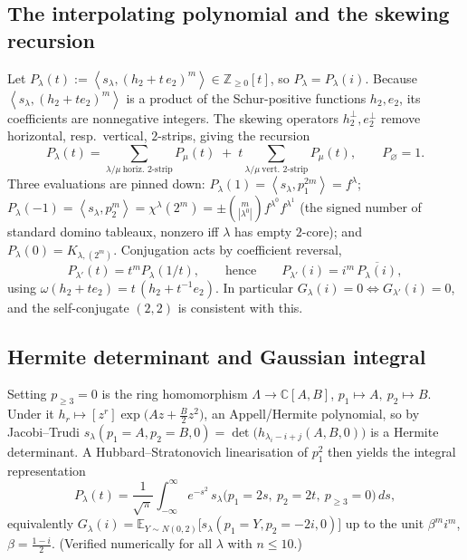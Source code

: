 \documentclass[11pt]{article}
\theoremstyle{definition}
\theoremstyle{remark}
\newcommand{\ZZ}{\mathbb{Z}}
\newcommand{\CC}{\mathbb{C}}
\newcommand{\la}{\lambda}
\newcommand{\inner}[1]{\left\langle #1 \right\rangle}
\begin{document}
\subsection{The interpolating polynomial and the skewing recursion}
Let $P_\la(t):=\inner{s_\la,(h_2+t\,e_2)^m}\in\ZZ_{\ge0}[t]$, so $P_\la=P_\la(i)$.
Because $\inner{s_\la,(h_2+te_2)^m}$ is a product of the Schur-positive functions
$h_2,e_2$, its coefficients are nonnegative integers. The skewing operators
$h_2^{\perp},e_2^{\perp}$ remove horizontal, resp.\ vertical, $2$-strips, giving
the recursion
\begin{equation}\label{eq:rec}
  P_\la(t)=\sum_{\la/\mu\ \text{horiz.\ }2\text{-strip}}P_\mu(t)
          \;+\;t\!\!\sum_{\la/\mu\ \text{vert.\ }2\text{-strip}}\!\!P_\mu(t),
  \qquad P_\varnothing=1.
\end{equation}
Three evaluations are pinned down: $P_\la(1)=\inner{s_\la,p_1^{2m}}=f^\la$;
$P_\la(-1)=\inner{s_\la,p_2^{m}}=\chi^\la(2^m)=\pm\binom{m}{|\la^0|}f^{\la^0}f^{\la^1}$
(the signed number of standard domino tableaux, nonzero iff $\la$ has empty
$2$-core); and $P_\la(0)=K_{\la,(2^m)}$. Conjugation acts by coefficient
reversal,
\begin{equation}\label{eq:conj}
  P_{\la'}(t)=t^{m}P_\la(1/t),\qquad\text{hence}\qquad
  P_{\la'}(i)=i^{m}\,\overline{P_\la(i)},
\end{equation}
using $\omega(h_2+te_2)=t\,(h_2+t^{-1}e_2)$. In particular $G_\la(i)=0\iff
G_{\la'}(i)=0$, and the self-conjugate $(2,2)$ is consistent with this.

\subsection{Hermite determinant and Gaussian integral}
Setting $p_{\ge3}=0$ is the ring homomorphism $\Lambda\to\CC[A,B]$,
$p_1\mapsto A,\ p_2\mapsto B$. Under it
$h_r\mapsto[z^r]\exp\!\big(Az+\tfrac{B}{2}z^2\big)$, an Appell/Hermite polynomial,
so by Jacobi--Trudi $s_\la(p_1{=}A,p_2{=}B,0)=\det\big(h_{\la_i-i+j}(A,B,0)\big)$
is a Hermite determinant. A Hubbard--Stratonovich linearisation of $p_1^2$ then
yields the integral representation
\begin{equation}\label{eq:gauss}
  P_\la(t)=\frac1{\sqrt\pi}\int_{-\infty}^{\infty} e^{-s^2}\,
           s_\la\big(p_1{=}2s,\ p_2{=}2t,\ p_{\ge3}{=}0\big)\,ds ,
\end{equation}
equivalently $G_\la(i)=\mathbb E_{Y\sim N(0,2)}\big[s_\la(p_1{=}Y,p_2{=}-2i,0)\big]$
up to the unit $\beta^m i^m$, $\beta=\tfrac{1-i}2$. (Verified numerically for all
$\la$ with $n\le10$.)
\end{document}
